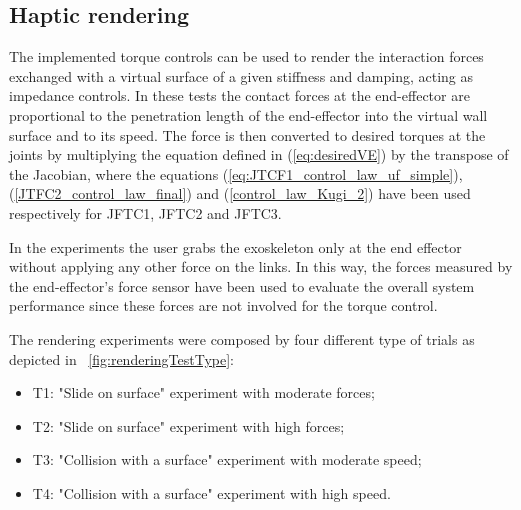 \documentclass[journal]{IEEEtran}
\begin{document}
\subsection{Haptic rendering}

The implemented torque controls can be used to render the interaction forces exchanged with a virtual surface of a given stiffness and damping, acting as impedance controls. In these tests the contact forces at the end-effector are proportional to the penetration length of the end-effector into the virtual wall surface and to its speed. The force is then converted to desired torques at the joints by multiplying the equation defined in (\ref{eq:desiredVE}) by the transpose of the Jacobian, where the equations (\ref{eq:JTCF1_control_law_uf_simple}), (\ref{JTFC2_control_law_final}) and (\ref{control_law_Kugi_2}) have been used respectively for JFTC1, JFTC2 and JFTC3.
\par In the experiments the user grabs the exoskeleton only at the end effector without applying any other force on the links. In this way, the forces measured by the end-effector's force sensor have been used to evaluate the overall system performance since these forces are not involved for the torque control.
\par The rendering experiments were composed by four different type of trials as depicted in \figurename \ \ref{fig:renderingTestType}:
\begin{itemize}
	\item T1: "Slide on surface" experiment with moderate forces;
	\item T2: "Slide on surface" experiment with high forces;
	\item T3: "Collision with a surface" experiment with moderate speed;
	\item T4: "Collision with a surface" experiment with high speed.
\end{itemize}
\end{document}
